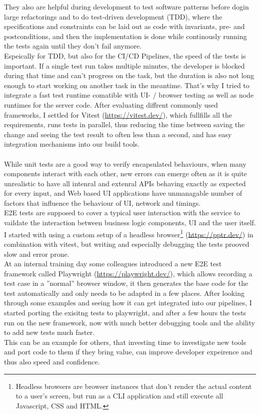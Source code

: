 They also are helpful during development to test software patterns before dogin large refactorings and to do test-driven development (TDD), where the specifications and constraints can be laid out as code
with invariants, pre- and postconditions, and then the implementation is done while continously running the tests again until they don't fail anymore.
\\
Espeically for TDD, but also for the CI/CD Pipelines, the speed of the tests is important. If a single test run takes multiple minutes, the developer is blocked during that time and can't progress on the task,
but the duration is also not long enough to start working on another task in the meantime.
That's why I tried to integrate a fast test runtime comatible with UI- / browser testing as well as node runtimes for the server code.
After evaluating diffrent commonly used frameworks, I settled for Vitest (\url{https://vitest.dev/}), which fullfills all the requirements, runs tests in parallel, thus reducing the
time between saving the change and seeing the test result to often less than a second, and has easy integration mechanisms into our build tools.
\\\\
While unit tests are a good way to verify encapsulated behaviours, when many components interact with each other, new errors can emerge often as it is
quite unrealistic to have all intenral and extenral APIs behaving exactly as expected for every input, and Web based UI applications have unmanagable number of factors that
influence the behaviour of UI, network and timings.
\\
E2E tests are supposed to cover a typical user interaction with the service to vaildate the interaction between business logic components, UI and the user itself.
I started with using a custom setup of a headless browser\footnote{Headless browsers are browser instances that don't render the actual content to a user's screen, but run as a CLI application and still execute all Javascript, CSS and HTML.} (\url{https://pptr.dev/}) in combination with vitest,
but writing and especially debugging the tests prooved slow and error prone.
\\
At an internal training day some colleagues introduced a new E2E test framework called Playwright (\url{https://playwright.dev/}), which allows recording a test case in a ''normal'' browser window, it then generates the base code for the test automatically and only needs to be adapted in a few places.
After looking through some examples and seeing how it can get integrated into our pipelines, I started porting the exisitng tests to playwright, and after a few hours the tests run on the new framework, now with much better debugging tools and the ability to add new tests much faster.
\\
This can be an example for others, that investing time to investigate new tools and port code to them if they bring value, can improve developer expeirence and thus also speed and confidence.

